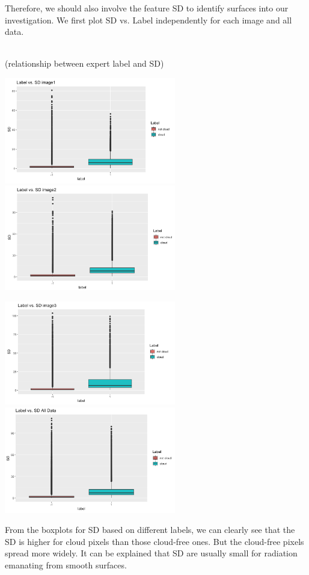 \documentclass[11pt]{article}
\begin{document}
Therefore, we should also involve the feature SD to identify surfaces into our investigation. We first plot SD vs. Label independently for each image and all data.

\mbox{}\\
(relationship between expert label and SD)

\includegraphics[width = 7.5cm]{1(c)image8.png}
\includegraphics[width = 7.5cm]{1(c)image9.png}

\includegraphics[width = 7.5cm]{1(c)image10.png}
\includegraphics[width = 7.5cm]{1(c)image11.png}

From the boxplots for SD based on different labels, we can clearly see that the SD is higher for cloud pixels than those cloud-free ones. But the cloud-free pixels spread more widely. It can be explained that SD are usually small for radiation emanating from smooth surfaces.
\end{document}
